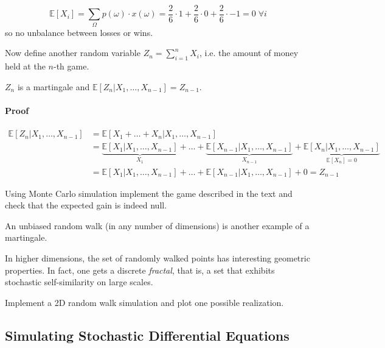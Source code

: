 \documentclass[12pt,a4paper]{article}
\begin{document}
$$\mathbb{E}[X_i]= \sum_{\Omega}p(\omega)\cdot x(\omega) = \frac{2}{6}\cdot 1 + \frac{2}{6}\cdot 0 + \frac{2}{6}\cdot -1 = 0\;\forall i$$
so no unbalance between losses or wins.

Now define another random variable $Z_n = \sum_{i=1}^{n} X_i$, i.e. the amount of money held at the $n$-th game.

$Z_n$ is a martingale and $\mathbb{E}[Z_n|X_1,\ldots, X_{n-1}] = Z_{n-1}$.

\paragraph{Proof}

\begin{equation*}
	\begin{aligned}
		\mathbb{E}[Z_n|X_1,\ldots, X_{n-1}] &= \mathbb{E}[X_1 +\ldots + X_n|X_1,\ldots, X_{n-1}] \\
		& = \underbrace{\mathbb{E}[X_1|X_1,\ldots, X_{n-1}]}_{X_1} + \ldots + \underbrace{\mathbb{E}[X_{n-1}|X_1,\ldots, X_{n-1}]}_{X_{n-1}} + \underbrace{\mathbb{E}[X_n|X_1,\ldots, X_{n-1}]}_{\mathbb{E}[X_n]=0} \\
		& = \mathbb{E}[X_1|X_1,\ldots, X_{n-1}] + \ldots + \mathbb{E}[X_{n-1}|X_1,\ldots, X_{n-1}] + 0 = Z_{n-1}
	\end{aligned}
\end{equation*}

\begin{question}
Using Monte Carlo simulation implement the game described in the text and check that the expected gain is indeed null.
\end{question}

\begin{question}
An unbiased random walk (in any number of dimensions) is another example of a martingale.

In higher dimensions, the set of randomly walked points has interesting geometric properties. In fact, one gets a discrete \emph{fractal}, that is, a set that exhibits stochastic self-similarity on large scales.

Implement a 2D random walk simulation and plot one possible realization.
\end{question}

\subsection{Simulating Stochastic Differential Equations}
\end{document}
